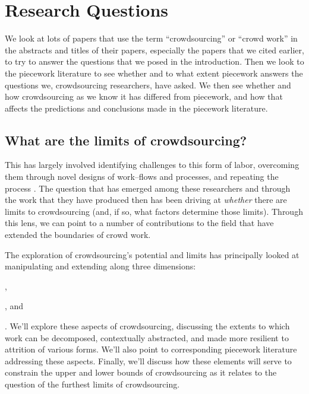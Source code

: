 \documentclass[trackingWork]{subfiles}
\begin{document}
\section{Research Questions}



We look at lots of papers that use the term ``crowdsourcing'' or ``crowd work''
in the abstracts and titles of their papers,  especially the papers that we cited earlier, to try
to answer the questions that we posed in the introduction.
Then we look to the piecework literature to see whether and to what extent
piecework answers the questions we, crowdsourcing researchers, have asked.
We then see whether and how crowdsourcing as we know it has differed from piecework,  and how that affects the predictions and conclusions made in the piecework literature.


\subsection{What are the limits of crowdsourcing?}
This has largely involved
  identifying challenges to this form of labor,    overcoming them through novel designs of work--flows and processes, and
  repeating the process
\cite[e.g.][]{bernsteinSoylent,foundry,crowdForgeKittur}.
The question that has emerged
among these researchers and
through the work that they have produced then
has been driving at \textit{whether} there are limits to crowdsourcing
(and, if so, what factors determine those limits).
Through this lens, we can point to
a number of contributions to the field that have extended the boundaries of crowd work.

The exploration of crowdsourcing's potential and limits has principally looked at
manipulating and extending along three dimensions:
\begin{inlinelist}
  \item {},    \item {}, and
  \item {}
\end{inlinelist}.
We'll explore these aspects of crowdsourcing,  discussing the extents to which work can be
decomposed,  contextually abstracted, and
made more resilient to attrition of various forms.
We'll also point to corresponding piecework literature addressing these aspects.
Finally, we'll discuss how these elements will serve
to constrain the upper and lower bounds of crowdsourcing as it relates
to the question of the furthest limits of crowdsourcing.
\end{document}
